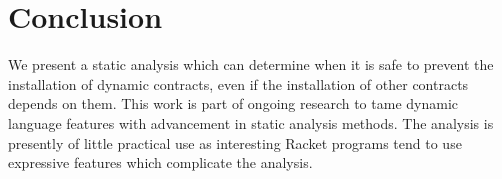 \section{Conclusion}
\label{sec:conclusion}

We present a static analysis which can determine when it is safe to prevent the installation of dynamic contracts, even if the installation of other contracts depends on them.
This work is part of ongoing research to tame dynamic language features with advancement in static analysis methods.
The analysis is presently of little practical use as interesting Racket programs tend to use expressive features which complicate the analysis.







